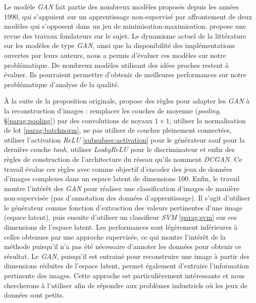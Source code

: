 Le modèle \textit{GAN} fait partie des nombreux modèles proposés depuis les années 1990, qui s'appuient sur un apprentissage non-supervisé par affrontement de deux modèles qui s'opposent dans un jeu de minimisation-maximisation.
\cite{schmidhuber_unsupervised_2019} propose une revue des travaux fondateurs sur le sujet.
Le dynamisme actuel de la littérature sur les modèles de type \textit{GAN}, ainsi que la disponibilité des implémentations ouvertes par leurs auteurs, nous a permis d'évaluer ces modèles sur notre problématique.
De nombreux modèles utilisant des idées proches restent à évaluer.
Ils pourraient permettre d'obtenir de meilleures performances sur notre problématique d'analyse de la qualité.

À la suite de la proposition originale, \cite{radford_unsupervised_2015} propose des règles pour adapter les \textit{GAN} à la reconstruction d'images : remplacer les couches de moyenne (\textit{pooling}, §\ref{parag:pooling}) par des convolutions de noyaux $1 \times 1$, utiliser la normalisation de lot \ref{parag:batchnorm}, ne pas utiliser de couches pleinement connectées, utiliser l'activation \textit{ReLU} \ref{subsubsec:activation} pour le générateur sauf pour la dernière couche \textit{tanh}, utiliser \textit{LeakyReLU} pour le discriminateur et enfin des règles de construction de l'architecture du réseau qu'ils nomment \textit{DCGAN}.
Ce travail évalue ces règles avec comme objectif d'encoder des jeux de données d'images complexes dans un espace latent de dimensions 100.
Enfin, le travail montre l'intérêt des \textit{GAN} pour réaliser une classification d'images de manière non-supervisée (pas d'annotation des données d'apprentissage).
Il s'agit d'utiliser le générateur comme fonction d'extraction des valeurs pertinentes d'une image (espace latent), puis ensuite d'utiliser un classifieur \textit{SVM} \ref{parag:svm} sur ces dimensions de l'espace latent.
Les performances sont légèrement inférieures à celles obtenues par une approche supervisée, ce qui montre l'intérêt de la méthode puisqu'il n'a pas été nécessaire d'annoter les données pour obtenir ce résultat.
Le \textit{GAN}, puisqu'il est entrainé pour reconstruire une image à partir des dimensions réduites de l'espace latent, permet également d'extraire l'information pertinente des images.
Cette approche est particulièrement intéressante et nous chercherons à l'utiliser afin de répondre aux problèmes industriels où les jeux de données sont petits.

